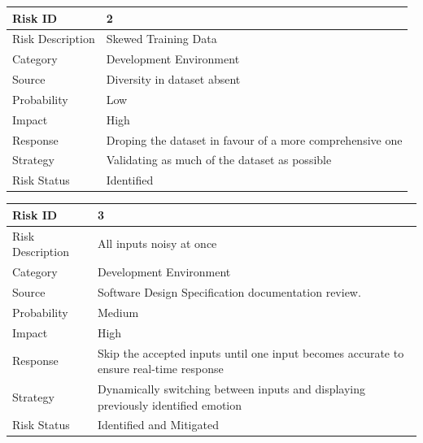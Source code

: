 \documentclass[oneside,a4paper,12pt]{report}
\begin{document}
\begin{normalsize}
\begin{table}[!htbp]
	\begin{center}
		\def\arraystretch{1.5}
		\begin{tabularx}{\textwidth}{| l | X |}
			\hline 
			Risk ID	& 2 \\ \hline
			Risk Description	& Skewed Training Data \\ \hline
			Category	& Development Environment \\ \hline
			Source	& Diversity in dataset absent \\ \hline
			Probability	& Low \\ \hline
			Impact	& High \\ \hline
			Response	& Droping the dataset in favour of a more comprehensive one \\ \hline
			Strategy	& Validating as much of the dataset as possible  \\ \hline
			Risk Status	& Identified\\ \hline
		\end{tabularx}
	\end{center}
	\label{tab:risk2}
\end{table}

\begin{table}[!htbp]
	\begin{center}
		\def\arraystretch{1.5}
		\begin{tabularx}{\textwidth}{| l | X |}
			\hline 
			Risk ID	& 3 \\ \hline
			Risk Description	& All inputs noisy at once \\ \hline
			Category	& Development Environment \\ \hline
			Source	& Software Design Specification documentation review. \\ \hline
			Probability	& Medium \\ \hline
			Impact	& High \\ \hline
			Response	& Skip the accepted inputs until one input becomes accurate to ensure real-time response \\ \hline
			Strategy	& Dynamically switching between inputs and displaying previously identified emotion \\ \hline
			Risk Status	& Identified and Mitigated \\ \hline
		\end{tabularx}
	\end{center}
	\label{tab:risk3}
\end{table}


\end{normalsize}
\end{document}
